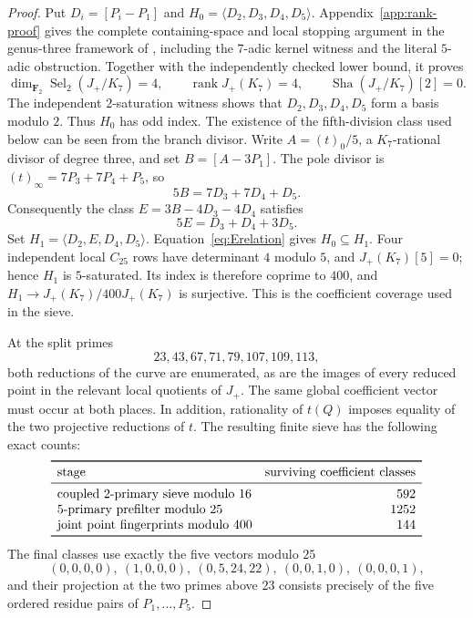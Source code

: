 \documentclass[11pt]{article}
\newcommand{\F}{\mathbf F}
\newcommand{\Sha}{\mathop{\mathrm{Sha}}}
\newcommand{\rank}{\operatorname{rank}}
\theoremstyle{definition}
\theoremstyle{remark}
\begin{document}
\begin{proof}
Put $D_i=[P_i-P_1]$ and $H_0=\langle D_2,D_3,D_4,D_5\rangle$.
Appendix~\ref{app:rank-proof} gives the complete containing-space and local
stopping argument in the genus-three framework of \cite{BPS}, including
the $7$-adic kernel witness and the literal $5$-adic obstruction.  Together
with the independently checked lower bound, it proves
\[
 \dim_{\F_2}\operatorname{Sel}_2(J_+/K_7)=4,
 \qquad \rank J_+(K_7)=4,
 \qquad \Sha(J_+/K_7)[2]=0.
\]
The independent $2$-saturation witness shows that $D_2,D_3,D_4,D_5$
form a basis modulo $2$.  Thus $H_0$ has odd index.  The existence of the fifth-division class used below can
be seen from the branch divisor.  Write $A=(t)_0/5$, a $K_7$-rational
divisor of degree three, and set $B=[A-3P_1]$.  The pole divisor is
$(t)_\infty=7P_3+7P_4+P_5$, so
\[
 5B=7D_3+7D_4+D_5.
\]
Consequently the class $E=3B-4D_3-4D_4$ satisfies
\begin{equation}\label{eq:Erelation}
                         5E=D_3+D_4+3D_5.
\end{equation}
Set $H_1=\langle D_2,E,D_4,D_5\rangle$.  Equation~\eqref{eq:Erelation}
gives $H_0\subseteq H_1$.  Four independent local $C_{25}$ rows have
determinant $4$ modulo $5$, and $J_+(K_7)[5]=0$; hence $H_1$ is
$5$-saturated.  Its index is therefore coprime to $400$, and
$H_1\to J_+(K_7)/400J_+(K_7)$ is surjective.  This is the coefficient
coverage used in the sieve.

At the split primes
\[
                     23,43,67,71,79,107,109,113,
\]
both reductions of the curve are enumerated, as are the images of every
reduced point in the relevant local quotients of $J_+$.  The same global
coefficient vector must occur at both places.  In addition, rationality of
$t(Q)$ imposes equality of the two projective reductions of $t$.  The
resulting finite sieve has the following exact counts:
\[
\begin{array}{lr}
\toprule
\text{stage}&\text{surviving coefficient classes}\\
\midrule
\text{coupled $2$-primary sieve modulo $16$}&592\\
\text{$5$-primary prefilter modulo $25$}&1252\\
\text{joint point fingerprints modulo $400$}&144\\
\bottomrule
\end{array}
\]
The final classes use exactly the five vectors modulo $25$
\[
 (0,0,0,0),\ (1,0,0,0),\ (0,5,24,22),\
 (0,0,1,0),\ (0,0,0,1),
\]
and their projection at the two primes above $23$ consists precisely of the
five ordered residue pairs of $P_1,\ldots,P_5$.


\end{proof}
\end{document}
